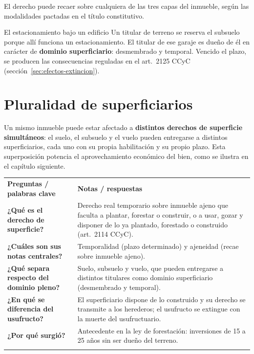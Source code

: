 \documentclass[12pt,oneside]{book}
\newcommand{\cq}[1]{\textbf{#1}}
\newcommand{\cornell}[3]{%
  \par\medskip\noindent\begingroup
  \renewcommand{\arraystretch}{1.25}%
  \begin{tabularx}{\textwidth}{|>{\raggedright\arraybackslash}p{0.27\textwidth}|>{\raggedright\arraybackslash}X|}
    \hline
    \multicolumn{2}{|>{\centering\arraybackslash}X|}{\cellcolor{azulacad!12}\textbf{Cuadro Cornell --- #1}}\\ \hline
    \cellcolor{gray!10}\textbf{Preguntas / palabras clave} & \cellcolor{gray!10}\textbf{Notas / respuestas} \\ \hline
    #2
    \multicolumn{2}{|>{\raggedright\arraybackslash}X|}{\cellcolor{azulacad!6}\textbf{Resumen.} #3}\\ \hline
  \end{tabularx}%
  \endgroup\par\medskip}
\begin{document}
El derecho puede recaer sobre cualquiera de las tres capas del inmueble, según las modalidades pactadas en el título constitutivo.

\begin{example}{El estacionamiento bajo un edificio}
Un titular de terreno se reserva el subsuelo porque allí funciona un estacionamiento. El titular de ese garaje es dueño de él en carácter de \textbf{dominio superficiario}: desmembrado y temporal. Vencido el plazo, se producen las consecuencias reguladas en el art.~2125 CCyC (sección~\ref{sec:efectos-extincion}).
\end{example}

\section{Pluralidad de superficiarios}

Un mismo inmueble puede estar afectado a \textbf{distintos derechos de superficie simultáneos}: el suelo, el subsuelo y el vuelo pueden entregarse a distintos superficiarios, cada uno con su propia habilitación y su propio plazo. Esta superposición potencia el aprovechamiento económico del bien, como se ilustra en el capítulo siguiente.

\cornell{Derecho de superficie: concepto y estructura}{
\cq{¿Qué es el derecho de superficie?} & Derecho real temporario sobre inmueble ajeno que faculta a plantar, forestar o construir, o a usar, gozar y disponer de lo ya plantado, forestado o construido (art.~2114 CCyC). \\ \hline
\cq{¿Cuáles son sus notas centrales?} & Temporalidad (plazo determinado) y ajeneidad (recae sobre inmueble ajeno). \\ \hline
\cq{¿Qué separa respecto del dominio pleno?} & Suelo, subsuelo y vuelo, que pueden entregarse a distintos titulares como dominio superficiario (desmembrado y temporal). \\ \hline
\cq{¿En qué se diferencia del usufructo?} & El superficiario dispone de lo construido y su derecho se transmite a los herederos; el usufructo se extingue con la muerte del usufructuario. \\ \hline
\cq{¿Por qué surgió?} & Antecedente en la ley de forestación: inversiones de 15 a 25 años sin ser dueño del terreno. \\ \hline
}{El derecho de superficie rompe la unidad clásica de suelo, subsuelo y vuelo, permitiendo a un tercero construir o plantar por un plazo determinado sin que el propietario pierda el dominio. Su rasgo distintivo frente al usufructo es la facultad de disposición y su transmisión a los herederos.}
\end{document}

